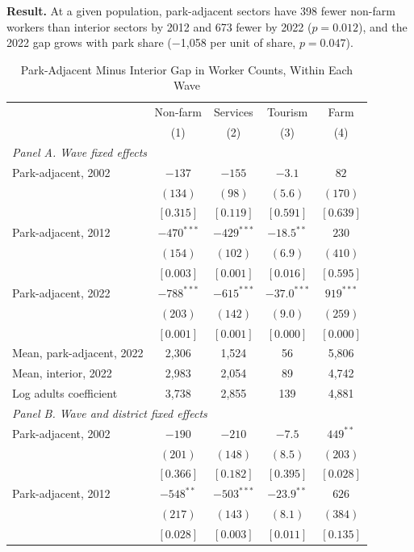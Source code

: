 \documentclass[11pt]{article}
\begin{document}
\textbf{Result.} At a given population, park-adjacent sectors have 398 fewer non-farm workers than interior sectors by 2012 and 673 fewer by 2022 ($p=0.012$), and the 2022 gap grows with park share ($-$1,058 per unit of share, $p=0.047$).
\clearpage
\begin{table}[H]
\centering\small\setlength{\tabcolsep}{4pt}
\caption{Park-Adjacent Minus Interior Gap in Worker Counts, Within Each Wave}
\label{tab:levelsgap}
\begin{tabular}{lcccc}
\toprule
 & Non-farm & Services & Tourism & Farm \\
 & (1) & (2) & (3) & (4) \\
\midrule
\multicolumn{5}{l}{\textit{Panel A. Wave fixed effects}} \\
Park-adjacent, 2002 & $-137$ & $-155$ & $-3.1$ & $82$ \\
 & $(134)$ & $(98)$ & $(5.6)$ & $(170)$ \\
 & $[0.315]$ & $[0.119]$ & $[0.591]$ & $[0.639]$ \\
Park-adjacent, 2012 & $-470^{***}$ & $-429^{***}$ & $-18.5^{**}$ & $230$ \\
 & $(154)$ & $(102)$ & $(6.9)$ & $(410)$ \\
 & $[0.003]$ & $[0.001]$ & $[0.016]$ & $[0.595]$ \\
Park-adjacent, 2022 & $-788^{***}$ & $-615^{***}$ & $-37.0^{***}$ & $919^{***}$ \\
 & $(203)$ & $(142)$ & $(9.0)$ & $(259)$ \\
 & $[0.001]$ & $[0.001]$ & $[0.000]$ & $[0.000]$ \\
Mean, park-adjacent, 2022 & 2,306 & 1,524 & 56 & 5,806 \\
Mean, interior, 2022 & 2,983 & 2,054 & 89 & 4,742 \\
Log adults coefficient & 3,738 & 2,855 & 139 & 4,881 \\
\multicolumn{5}{l}{\textit{Panel B. Wave and district fixed effects}} \\
Park-adjacent, 2002 & $-190$ & $-210$ & $-7.5$ & $449^{**}$ \\
 & $(201)$ & $(148)$ & $(8.5)$ & $(203)$ \\
 & $[0.366]$ & $[0.182]$ & $[0.395]$ & $[0.028]$ \\
Park-adjacent, 2012 & $-548^{**}$ & $-503^{***}$ & $-23.9^{**}$ & $626$ \\
 & $(217)$ & $(143)$ & $(8.1)$ & $(384)$ \\
 & $[0.028]$ & $[0.003]$ & $[0.011]$ & $[0.135]$ \\

\end{tabular}
\end{table}
\end{document}
